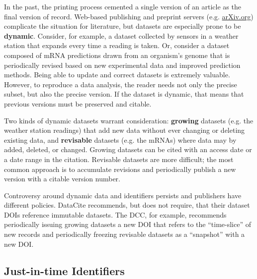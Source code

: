\documentclass[10pt,twocolumn]{article}
\begin{document}
In the past, the printing process cemented a single version of an article as the final version of record.
Web-based publishing and preprint servers (e.g. \href{http://arxiv.org/}{arXiv.org}) complicate the situation for literature, but datasets are especially prone to be \textbf{dynamic}.
Consider, for example, a dataset collected by sensors in a weather station that expands every time a reading is taken.
Or, consider a dataset composed of mRNA predictions drawn from an organism's genome that is periodically revised based on new experimental data and improved prediction methods. %
Being able to update and correct datasets is extremely valuable.
However, to reproduce a data analysis, the reader needs not only the precise subset, but also the precise version.
If the dataset is dynamic, that means that previous versions must be preserved and citable.

Two kinds of dynamic datasets warrant consideration: \textbf{growing} datasets (e.g. the weather station readings) that add new data without ever changing or deleting existing data, and \textbf{revisable} datasets (e.g. the mRNAs) where data may by added, deleted, or changed.  %
Growing datasets can be cited with an access date or a date range in the citation.
Revisable datasets are more difficult; the most common approach is to accumulate revisions and periodically publish a new version with a citable version number. %

Controversy around dynamic data and identifiers persists and publishers have different policies.
DataCite recommends, but does not require, that their dataset DOIs reference immutable datasets.  
The DCC, for example, recommends periodically issuing growing datasets a new DOI that refers to the ``time-slice'' of new records and periodically freezing revisable datasets as a ``snapshot'' with a new DOI.

\subsection*{Just-in-time Identifiers}\label{just-in-time-identifiers}
\end{document}
